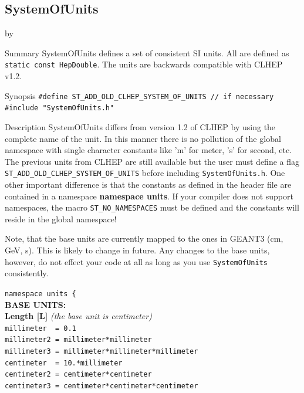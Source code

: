 \documentclass[twoside]{article}
\newcommand{\comp}[1]{\texttt{#1}}%
\newcommand{\entrylabel}[1]{\mbox{\textbf{{#1}}}\hfil}%
\newenvironment{entry}
{\begin{list}{}%
    {\renewcommand{\makelabel}{\entrylabel}%
     \setlength{\labelwidth}{90pt}%
     \setlength{\leftmargin}{\labelwidth}
     \advance\leftmargin by \labelsep%
      }%
    }%
  {\end{list}}
\newcommand{\Entrylabel}[1]%
{\raisebox{0pt}[1ex][0pt]{\makebox[\labelwidth][l]%
    {\parbox[t]{\labelwidth}{\hspace{0pt}\textbf{{#1}}}}}}
\newenvironment{Entry}%
{\renewcommand{\entrylabel}{\Entrylabel}\begin{entry}}%
  {\end{entry}}
\begin{document}
%
%
\subsection{SystemOfUnits} 
\label{SystemOfUnits}
\begin{Entry}
\item[Summary]
    SystemOfUnits defines a set of consistent SI units.
    All are defined as \comp{static const HepDouble}.
    The units are backwards compatible with CLHEP v1.2.

\item[Synopsis]
  \verb+#define ST_ADD_OLD_CLHEP_SYSTEM_OF_UNITS // if necessary+
  \verb+#include "SystemOfUnits.h"+
    
    
\item[Description] SystemOfUnits differs from version 1.2 of
    CLHEP by using the complete name of the unit.  In
    this manner there is no pollution of the global namespace with
    single character constants like 'm' for meter, 's' for second,
    etc.  The previous units from CLHEP are still available but the
    user must define a flag
    \texttt{ST\_ADD\_OLD\_CLHEP\_\-SYSTEM\_\-OF\_UNITS} before including
    \texttt{SystemOfUnits.h}.  One other important difference is that
    the constants as defined in the header file are contained in a
    namespace {\bf namespace units}.  If your
    compiler does not support namespaces, the macro
    \texttt{ST\_NO\_NAMESPACES} must be defined and the constants will
    reside in the global namespace!
    
    Note, that the base units are currently mapped to the ones in
    GEANT3 (cm, GeV, s).  This is likely to change in
    future. Any changes to the base units, however, do not effect your
    code at all as long as you use \texttt{SystemOfUnits}
    consistently.
  
  \verb+namespace units {+\\
  {\bf BASE UNITS: \\Length [L]} {\it (the base unit is centimeter)}\\
  \verb+millimeter  = 0.1+ \\  
  \verb+millimeter2 = millimeter*millimeter+\\
  \verb+millimeter3 = millimeter*millimeter*millimeter+\\

  \verb+centimeter  = 10.*millimeter+ \\
  \verb+centimeter2 = centimeter*centimeter+ \\
  \verb+centimeter3 = centimeter*centimeter*centimeter+ \\


\end{Entry}
\end{document}
